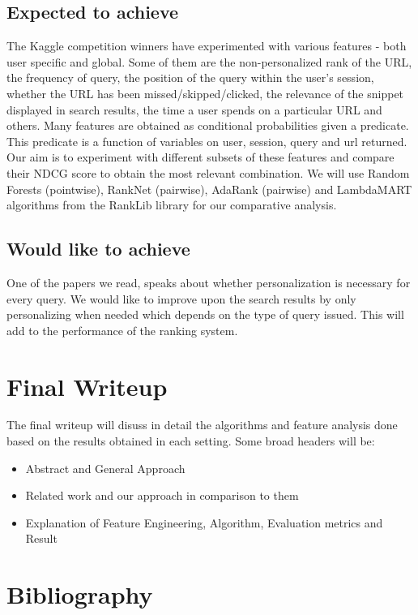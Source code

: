 \documentclass[11pt]{article}
\begin{document}
\subsection{Expected to achieve}
The Kaggle competition winners have experimented with various features - both user specific and global. Some of them are the non-personalized rank of the URL, the frequency of query, the position of the query within the user's session, whether the URL has been missed/skipped/clicked, the relevance of the snippet displayed in search results, the time a user spends on a particular URL and others. Many features are obtained as conditional probabilities given a predicate. This predicate is a function of variables on user, session, query and url returned.
\newline
Our aim is to experiment with different subsets of these features and compare their NDCG score to obtain the most relevant combination. We will use Random Forests (pointwise), RankNet (pairwise), AdaRank (pairwise) and LambdaMART algorithms from the RankLib library for our comparative analysis.
\subsection{Would like to achieve}
One of the papers we read, speaks about whether personalization is necessary for every query. We would like to improve upon the search results by only personalizing when needed which depends on the type of query issued. This will add to the performance of the ranking system.
\section{Final Writeup} The final writeup will disuss in detail the algorithms and feature analysis done based on the results obtained in each setting. Some broad headers will be:\\
\vspace{-5mm} 
\begin{itemize}\setlength{\itemsep}{-5pt}
\item Abstract and General Approach
\item Related work and our approach in comparison to them
\item Explanation of Feature Engineering, Algorithm, Evaluation metrics and Result  
\end{itemize}
\noindent
\section{Bibliography}
\end{document}
